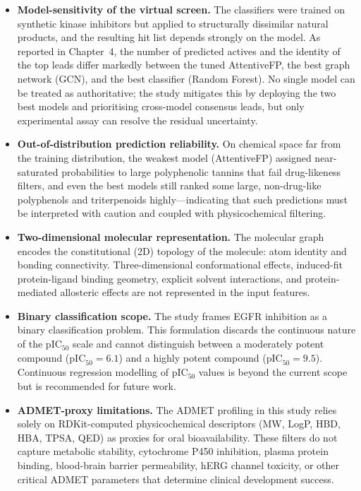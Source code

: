 \begin{itemize}
    \item \textbf{Model-sensitivity of the virtual screen.} The classifiers were
    trained on synthetic kinase inhibitors but applied to structurally dissimilar
    natural products, and the resulting hit list depends strongly on the model. As
    reported in Chapter~4, the number of predicted actives and the identity of the top
    leads differ markedly between the tuned AttentiveFP, the best graph network (GCN),
    and the best classifier (Random Forest). No single model can be treated as
    authoritative; the study mitigates this by deploying the two best models and
    prioritising cross-model consensus leads, but only experimental assay can resolve
    the residual uncertainty.

    \item \textbf{Out-of-distribution prediction reliability.} On chemical space far
    from the training distribution, the weakest model (AttentiveFP) assigned
    near-saturated probabilities to large polyphenolic tannins that fail drug-likeness
    filters, and even the best models still ranked some large, non-drug-like
    polyphenols and triterpenoids highly---indicating that such predictions must be
    interpreted with caution and coupled with physicochemical filtering.

    \item \textbf{Two-dimensional molecular representation.} The molecular graph
    encodes the constitutional (2D) topology of the molecule: atom identity and
    bonding connectivity. Three-dimensional conformational effects, induced-fit
    protein-ligand binding geometry, explicit solvent interactions, and
    protein-mediated allosteric effects are not represented in the input features.

    \item \textbf{Binary classification scope.} The study frames EGFR inhibition
    as a binary classification problem. This formulation discards the continuous
    nature of the pIC$_{50}$ scale and cannot distinguish between a moderately
    potent compound ($\text{pIC}_{50} = 6.1$) and a highly potent compound
    ($\text{pIC}_{50} = 9.5$). Continuous regression modelling of pIC$_{50}$
    values is beyond the current scope but is recommended for future work.

    \item \textbf{ADMET-proxy limitations.} The ADMET profiling in this study
    relies solely on RDKit-computed physicochemical descriptors (MW, LogP, HBD,
    HBA, TPSA, QED) as proxies for oral bioavailability. These filters do not
    capture metabolic stability, cytochrome P450 inhibition, plasma protein binding,
    blood-brain barrier permeability, hERG channel toxicity, or other critical
    ADMET parameters that determine clinical development success.
\end{itemize}

